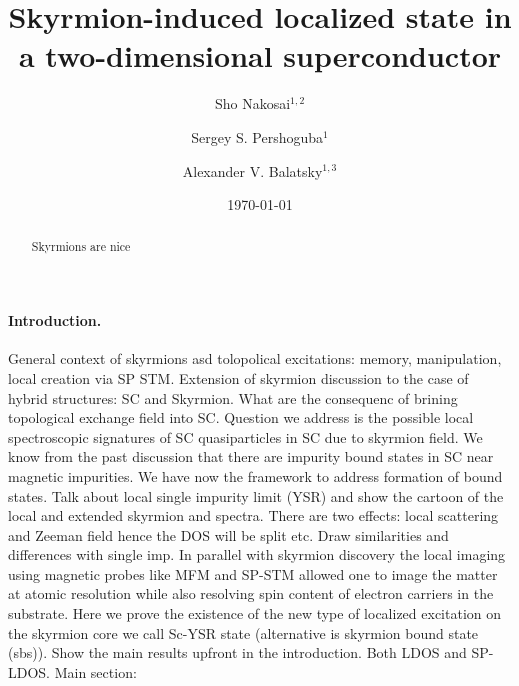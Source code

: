 \documentclass[twocolumn,showpacs,floatfix,nofootinbib,longbibliography]{revtex4-1}
\begin{document}
\title{Skyrmion-induced localized state in a two-dimensional superconductor}

\author{Sho Nakosai$^{1,2}$}
\author{Sergey S. Pershoguba$^{1}$}
\author{Alexander V. Balatsky$^{1,3}$}

\date{\today}


\begin{abstract}
Skyrmions are nice
\end{abstract}

\pacs{ }


\maketitle
\paragraph*{Introduction.} \label{sec:intro}

General context of skyrmions asd tolopolical excitations: memory, manipulation, local creation via SP STM.
Extension of skyrmion discussion to the case of hybrid structures: SC and Skyrmion. What are the consequenc of brining topological exchange field into SC. Question we address is the possible local spectroscopic signatures of SC quasiparticles in SC due to skyrmion field. We know from the past discussion that there are impurity bound states in SC near magnetic impurities. We have now the framework to address formation of bound states. Talk about local single impurity limit (YSR) and show the cartoon of the local and extended skyrmion and spectra. There are two effects: local scattering and Zeeman field hence the DOS will be split etc.  Draw similarities and differences with single imp.
In parallel with skyrmion discovery the local imaging using magnetic probes like MFM and SP-STM allowed one to image the matter at atomic resolution while also resolving spin content of electron carriers in the substrate.
Here we prove the existence of the new type of localized excitation on the skyrmion core we call  Sc-YSR state (alternative is skyrmion bound state (sbs)).  Show the main results upfront in the introduction. Both LDOS and SP-LDOS.
Main section:
\end{document}
